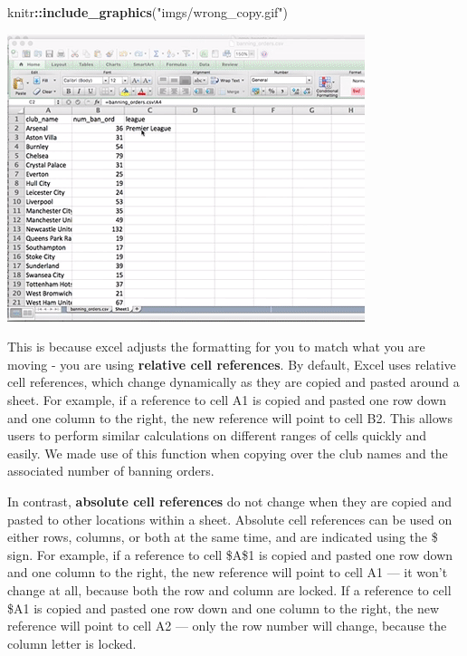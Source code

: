 \documentclass[]{book}
\newenvironment{Shaded}{\begin{snugshade}}{\end{snugshade}}
\newcommand{\KeywordTok}[1]{\textcolor[rgb]{0.13,0.29,0.53}{\textbf{#1}}}
\newcommand{\NormalTok}[1]{#1}
\newcommand{\OperatorTok}[1]{\textcolor[rgb]{0.81,0.36,0.00}{\textbf{#1}}}
\newcommand{\StringTok}[1]{\textcolor[rgb]{0.31,0.60,0.02}{#1}}
\theoremstyle{definition}
\theoremstyle{definition}
\theoremstyle{definition}
\theoremstyle{remark}
\begin{document}
\begin{Shaded}
\begin{Highlighting}[]
\NormalTok{knitr}\OperatorTok{::}\KeywordTok{include_graphics}\NormalTok{(}\StringTok{"imgs/wrong_copy.gif"}\NormalTok{)}
\end{Highlighting}
\end{Shaded}

\includegraphics{imgs/wrong_copy.gif}

This is because excel adjusts the formatting for you to match what you
are moving - you are using \textbf{relative cell references}. By
default, Excel uses relative cell references, which change dynamically
as they are copied and pasted around a sheet. For example, if a
reference to cell A1 is copied and pasted one row down and one column to
the right, the new reference will point to cell B2. This allows users to
perform similar calculations on different ranges of cells quickly and
easily. We made use of this function when copying over the club names
and the associated number of banning orders.

In contrast, \textbf{absolute cell references} do not change when they
are copied and pasted to other locations within a sheet. Absolute cell
references can be used on either rows, columns, or both at the same
time, and are indicated using the \$ sign. For example, if a reference
to cell \$A\$1 is copied and pasted one row down and one column to the
right, the new reference will point to cell A1 --- it won't change at
all, because both the row and column are locked. If a reference to cell
\$A1 is copied and pasted one row down and one column to the right, the
new reference will point to cell A2 --- only the row number will change,
because the column letter is locked.
\end{document}
